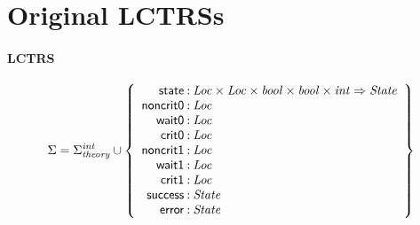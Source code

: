 \documentclass[a4paper]{article}
\newcommand{\Sort}[1]{\mathit{#1}}
\newcommand{\symb}[1]{\mathsf{#1}}
\newcommand{\Sigmainttheory}{\Sigma^{\mathit{int}}_{\mathit{theory}}}
\begin{document}

\section*{Original LCTRSs}

\paragraph{LCTRS}

\[
\Sigma = 
\Sigmainttheory \cup\left\{
\begin{array}{r@{\>}c@{\>}l}
\symb{state} & : & \Sort{Loc} \times \Sort{Loc} \times \Sort{bool} \times \Sort{bool} \times \Sort{int} \Rightarrow \Sort{State}\\
\symb{noncrit0} & : & \Sort{Loc}\\
\symb{wait0} & : & \Sort{Loc}\\
\symb{crit0} & : & \Sort{Loc}\\
\symb{noncrit1} & : & \Sort{Loc}\\
\symb{wait1} & : & \Sort{Loc}\\
\symb{crit1} & : & \Sort{Loc}\\
\symb{success} & : & \Sort{State}\\
\symb{error} & : & \Sort{State}\\
\end{array}
\right\}
\]
\end{document}
